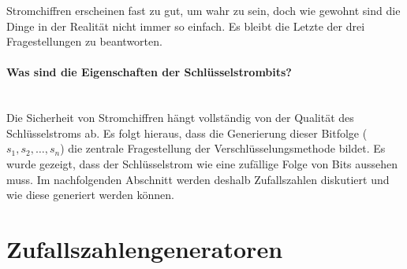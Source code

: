 \noindent
Stromchiffren erscheinen fast zu gut, um wahr zu sein, doch wie gewohnt sind die Dinge in
der Realität nicht immer so einfach. Es bleibt die Letzte der drei Fragestellungen zu
beantworten.
\newpage

\paragraph{Was sind die Eigenschaften der Schlüsselstrombits?}\mbox{}\\
Die Sicherheit von Stromchiffren hängt vollständig von der Qualität des Schlüsselstroms ab.
Es folgt hieraus, dass die Generierung dieser Bitfolge
($s_1,s_2,\dots,s_n$) die zentrale Fragestellung der Verschlüsselungsmethode bildet.
Es wurde gezeigt, dass der Schlüsselstrom wie eine zufällige
Folge von Bits aussehen muss. Im nachfolgenden Abschnitt werden deshalb Zufallszahlen
diskutiert und wie diese generiert werden können.

\section{Zufallszahlengeneratoren}